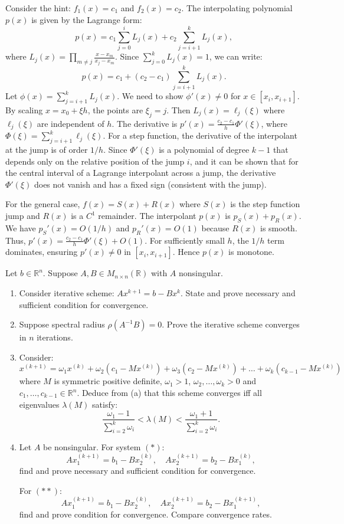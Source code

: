 \begin{solution}
Consider the hint: $f_1(x) = c_1$ and $f_2(x) = c_2$. The interpolating polynomial $p(x)$ is given by the Lagrange form:
\[
p(x) = c_1 \sum_{j=0}^i L_j(x) + c_2 \sum_{j=i+1}^k L_j(x),
\]
where $L_j(x) = \prod_{m \neq j} \frac{x - x_m}{x_j - x_m}$. Since $\sum_{j=0}^k L_j(x) = 1$, we can write:
\[
p(x) = c_1 + (c_2 - c_1) \sum_{j=i+1}^k L_j(x).
\]
Let $\phi(x) = \sum_{j=i+1}^k L_j(x)$. We need to show $\phi'(x) \neq 0$ for $x \in [x_i, x_{i+1}]$.
By scaling $x = x_0 + \xi h$, the points are $\xi_j = j$. Then $L_j(x) = \ell_j(\xi)$ where $\ell_j(\xi)$ are independent of $h$.
The derivative is $p'(x) = \frac{c_2 - c_1}{h} \Phi'(\xi)$, where $\Phi(\xi) = \sum_{j=i+1}^k \ell_j(\xi)$.
For a step function, the derivative of the interpolant at the jump is of order $1/h$. Since $\Phi'(\xi)$ is a polynomial of degree $k-1$ that depends only on the relative position of the jump $i$, and it can be shown that for the central interval of a Lagrange interpolant across a jump, the derivative $\Phi'(\xi)$ does not vanish and has a fixed sign (consistent with the jump).

For the general case, $f(x) = S(x) + R(x)$ where $S(x)$ is the step function jump and $R(x)$ is a $C^1$ remainder. The interpolant $p(x)$ is $p_S(x) + p_R(x)$.
We have $p_S'(x) = O(1/h)$ and $p_R'(x) = O(1)$ because $R(x)$ is smooth.
Thus, $p'(x) = \frac{c_2 - c_1}{h} \Phi'(\xi) + O(1)$.
For sufficiently small $h$, the $1/h$ term dominates, ensuring $p'(x) \neq 0$ in $[x_i, x_{i+1}]$. Hence $p(x)$ is monotone.
\end{solution}

\begin{exercise}
\label{applied:2017:4}
Let $b\in\mathbb{R}^{n}$. Suppose $A,B\in M_{n\times n}(\mathbb{R})$ with $A$ nonsingular.

\begin{enumerate}
\item[(a)] Consider iterative scheme: $Ax^{k+1}=b-Bx^{k}$. State and prove necessary and sufficient condition for convergence.
\item[(b)] Suppose spectral radius $\rho(A^{-1}B)=0$. Prove the iterative scheme converges in $n$ iterations.
\item[(c)] Consider:
\[
x^{(k+1)}=\omega_{1}x^{(k)}+\omega_{2}(c_{1}-Mx^{(k)})+\omega_{3}(c_{2}-Mx^{(k)})+\dots+\omega_{k}(c_{k-1}-Mx^{(k)})
\]
where $M$ is symmetric positive definite, $\omega_{1}>1$, $\omega_{2},\dots,\omega_{k}>0$ and $c_{1},\dots,c_{k-1}\in\mathbb{R}^{n}$. Deduce from (a) that this scheme converges iff all eigenvalues $\lambda(M)$ satisfy:
\[
\frac{\omega_{1}-1}{\sum_{i=2}^{k}\omega_{i}}<\lambda(M)<\frac{\omega_{1}+1}{\sum_{i=2}^{k}\omega_{i}}.
\]
\item[(d)] Let $A$ be nonsingular. For system $(*)$:
\[
Ax_{1}^{(k+1)}=b_{1}-Bx_{2}^{(k)},\quad Ax_{2}^{(k+1)}=b_{2}-Bx_{1}^{(k)},
\]
find and prove necessary and sufficient condition for convergence.

For $(**)$:
\[
Ax_{1}^{(k+1)}=b_{1}-Bx_{2}^{(k)},\quad Ax_{2}^{(k+1)}=b_{2}-Bx_{1}^{(k+1)},
\]
find and prove condition for convergence. Compare convergence rates.
\end{enumerate}
\end{exercise}

